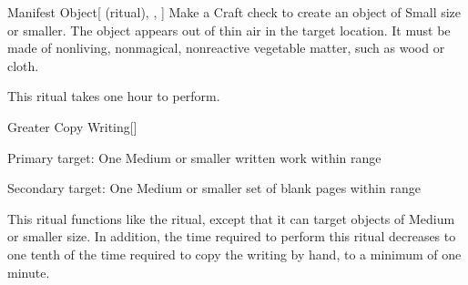 \lowercase{\hypertarget{spell:Manifest Object}{}}\label{spell:Manifest Object}
\begin{attuneability}[Rank 3]{\hypertarget{spell:Manifest Object}{Manifest Object}}[ (ritual), , ]
Make a Craft check to create an object of Small size or smaller.
The object appears out of thin air in the target location.
It must be made of nonliving, nonmagical, nonreactive vegetable matter, such as wood or cloth.

This ritual takes one hour to perform.
\end{attuneability}
\vspace{0.25em}



\lowercase{\hypertarget{spell:Greater Copy Writing}{}}\label{spell:Greater Copy Writing}
\begin{freeability}[Rank 4]{\hypertarget{spell:Greater Copy Writing}{Greater Copy Writing}}[]

Primary target: One Medium or smaller written work within \rngclose range
\par\noindent
Secondary target: One Medium or smaller set of blank pages within \rngclose range

This ritual functions like the  ritual, except that it can target objects of Medium or smaller size.
In addition, the time required to perform this ritual decreases to one tenth of the time required to copy the writing by hand, to a minimum of one minute.
\end{freeability}
\vspace{0.25em}


